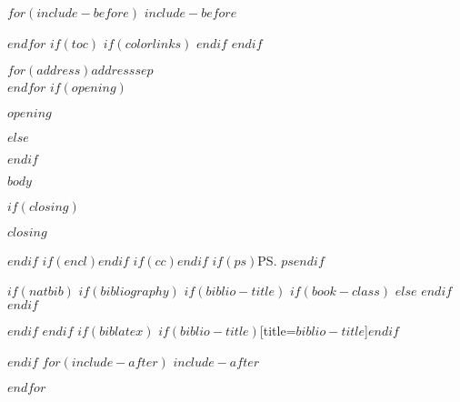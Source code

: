 \documentclass[version=last,$if(fontsize)$$fontsize$$else$12pt$endif$,{"$if(lco)$$lco$$else$$lco_default$$endif$"},$if(lang)$$babel-lang$,$endif$$if(address)$$else$addrfield=false,$endif$$if(papersize)$$papersize$paper,$endif$$for(classoption)$$classoption$$sep$,$endfor$]{scrlttr2}
\begin{document}
$for(include-before)$
$include-before$

$endfor$
$if(toc)$
{
$if(colorlinks)$
\hypersetup{linkcolor=$if(toccolor)$$toccolor$$else$black$endif$}
$endif$
\setcounter{tocdepth}{$toc-depth$}
\tableofcontents
}
$endif$

\begin{letter}{$for(address)$$address$$sep$\\$endfor$}
$if(opening)$\opening{$opening$}$else$\opening{}$endif$

$body$

$if(closing)$\closing{$closing$}$endif$
$if(encl)$$endif$
$if(cc)$$endif$
$if(ps)$\ps{$ps$}$endif$

\end{letter}

$if(natbib)$
$if(bibliography)$
$if(biblio-title)$
$if(book-class)$
\renewcommand\bibname{$biblio-title$}
$else$
\renewcommand\refname{$biblio-title$}
$endif$
$endif$


$endif$
$endif$
$if(biblatex)$
\printbibliography$if(biblio-title)$[title=$biblio-title$]$endif$

$endif$
$for(include-after)$
$include-after$

$endfor$
\end{document}

